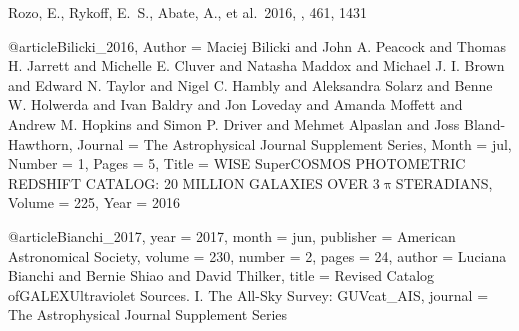  Rozo, E., Rykoff, E.~S., Abate, A., et al.\ 2016, \mnras, 461, 1431

@article{Bilicki_2016,
	Author = {Maciej Bilicki and John A. Peacock and Thomas H. Jarrett and Michelle E. Cluver and Natasha Maddox and Michael J. I. Brown and Edward N. Taylor and Nigel C. Hambly and Aleksandra Solarz and Benne W. Holwerda and Ivan Baldry and Jon Loveday and Amanda Moffett and Andrew M. Hopkins and Simon P. Driver and Mehmet Alpaslan and Joss Bland-Hawthorn},
	Journal = {The Astrophysical Journal Supplement Series},
	Month = {jul},
	Number = {1},
	Pages = {5},
	Title = {{WISE}{\texttimes} {SuperCOSMOS} {PHOTOMETRIC} {REDSHIFT} {CATALOG}: 20 {MILLION} {GALAXIES} {OVER} 3$\uppi${STERADIANS}},
	Volume = {225},
	Year = 2016}

@article{Bianchi_2017,
	year = 2017,
	month = {jun},
	publisher = {American Astronomical Society},
	volume = {230},
	number = {2},
	pages = {24},
	author = {Luciana Bianchi and Bernie Shiao and David Thilker},
	title = {Revised Catalog {ofGALEXUltraviolet} Sources. I. The All-Sky Survey: {GUVcat}{\_}{AIS}},
	journal = {The Astrophysical Journal Supplement Series}
	}